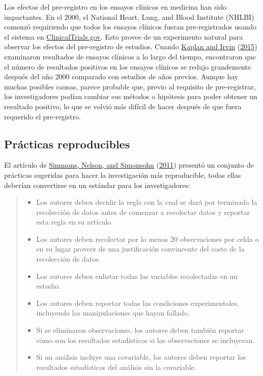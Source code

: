 \documentclass[
  12pt,
]{book}
\providecommand{\tightlist}{%
  \setlength{\itemsep}{0pt}\setlength{\parskip}{0pt}}
\begin{document}
Los efectos del pre-registro en los ensayos clínicos en medicina han sido impactantes. En el 2000, el National Heart, Lung, and Blood Institute (NHLBI) comenzó requiriendo que todos los ensayos clínicos fueran pre-registrados usando el sistema en \href{http://clinicaltrials.gov}{ClinicalTrials.gov}. Esto provee de un experimento natural para observar los efectos del pre-registro de estudios. Cuando \protect\hyperlink{ref-kapl:irvi:2015}{Kaplan and Irvin} (\protect\hyperlink{ref-kapl:irvi:2015}{2015}) examinaron resultados de ensayos clínicos a lo largo del tiempo, encontraron que el número de resultados positivos en los ensayos clínicos se redujo grandemente después del año 2000 comparado con estudios de años previos. Aunque hay muchas posibles causas, parece probable que, previo al requisito de pre-registrar, los investigadores podían cambiar sus métodos o hipótesis para poder obtener un resultado positivo, lo que se volvió más difícil de hacer después de que fuera requerido el pre-registro.

\hypertarget{pruxe1cticas-reproducibles}{%
\subsection{Prácticas reproducibles}\label{pruxe1cticas-reproducibles}}

El artículo de \protect\hyperlink{ref-simm:nels:simo:2011}{Simmons, Nelson, and Simonsohn} (\protect\hyperlink{ref-simm:nels:simo:2011}{2011}) presentó un conjunto de prácticas sugeridas para hacer la investigación más reproducible, todas ellas deberían convertirse en un estándar para los investigadores:

\begin{quote}
\begin{itemize}
\tightlist
\item
  Los autores deben decidir la regla con la cual se dará por terminada la recolección de datos antes de comenzar a recolectar datos y reportar esta regla en su artículo.
\item
  Los autores deben recolectar por lo menos 20 observaciones por celda o en su lugar proveer de una justificación convincente del costo de la recolección de datos.
\item
  Los autores deben enlistar todas las variables recolectadas en un estudio.
\item
  Los autores deben reportar todas las condiciones experimentales, incluyendo las manipulaciones que hayan fallado.
\item
  Si se eliminaron observaciones, los autores deben también reportar cómo son los resultados estadísticos si las observaciones se incluyeran.
\item
  Si un análisis incluye una covariable, los autores deben reportar los resultados estadísticos del análisis sin la covariable.
\end{itemize}
\end{quote}
\end{document}
